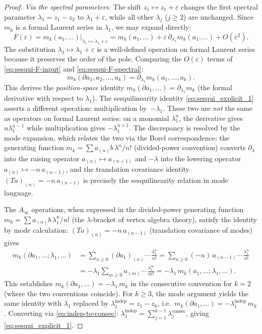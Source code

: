 \begin{proof}
\emph{Via the spectral parameters:}
The shift $z_1 \mapsto z_1 + \varepsilon$ changes the first
spectral parameter $\lambda_1 = z_1 - z_2$ to $\lambda_1 +
\varepsilon$, while all other $\lambda_j$ ($j \geq 2$) are
unchanged. Since $m_k$ is a formal Laurent series in
$\lambda_1$, we may expand directly:
\begin{equation}\label{eq:sesqui-F-spectral}
 F(\varepsilon)
 = m_k(a_1,\ldots)|_{\lambda_1 \mapsto \lambda_1 + \varepsilon}
 = m_k(a_1,\ldots)
 + \varepsilon\,\partial_{\lambda_1} m_k(a_1,\ldots)
 + O(\varepsilon^2).
\end{equation}
The substitution $\lambda_1 \mapsto \lambda_1 + \varepsilon$ is
a well-defined operation on formal Laurent series because it
preserves the order of the pole.
Comparing the $O(\varepsilon)$ terms of \eqref{eq:sesqui-F-input}
and \eqref{eq:sesqui-F-spectral}:
\[
 m_k(\partial a_1, a_2, \ldots, a_k)
 = \partial_{\lambda_1} m_k(a_1, \ldots, a_k).
\]
This derives the \emph{position-space} identity
$m_k(\partial a_1,\ldots) = \partial_{\lambda_1} m_k$
(the formal derivative with respect to $\lambda_1$).
The sesquilinearity identity \eqref{eq:sesqui_explicit_1} asserts
a different operation: multiplication by~$-\lambda_1$. These two
are \emph{not} the same as operators on formal Laurent series: on
a monomial $\lambda_1^n$, the derivative gives $n\lambda_1^{n-1}$
while multiplication gives $-\lambda_1^{n+1}$. The discrepancy is
resolved by the mode expansion, which relates the two via the
Borel correspondence: the generating function
$m_k = \sum a_{(n)}b\, \lambda^n/n!$ (divided-power convention)
converts $\partial_\lambda$ into the raising operator
$a_{(n)} \mapsto a_{(n+1)}$ and $-\lambda$ into the lowering
operator $a_{(n)} \mapsto -n\, a_{(n-1)}$, and the translation
covariance identity $(Ta)_{(n)} = -n\,a_{(n-1)}$ is precisely
the sesquilinearity relation in mode language.

The $A_\infty$ operations, when expressed in the divided-power generating function
$m_k = \sum a_{(n)}b\,\lambda_1^n/n!$ (the $\lambda$-bracket of vertex algebra
theory), satisfy the identity by mode calculation:
$(Ta)_{(n)} = -n\,a_{(n-1)}$ (translation covariance of modes) gives
\begin{align*}
 m_k(\partial a_1,\ldots;\lambda_1,\ldots)
 &= \textstyle\sum_{n\ge 0} (\partial a_1)_{(n)}\cdots\, \frac{\lambda_1^n}{n!}
 = \textstyle\sum_{n\ge 0} (-n)\, a_{(n-1)}\cdots\, \frac{\lambda_1^n}{n!}\\
 &= -\lambda_1 \textstyle\sum_{m\ge 0} a_{(m)}\cdots\, \frac{\lambda_1^m}{m!}
 = -\lambda_1\, m_k(a_1,\ldots;\lambda_1,\ldots).
\end{align*}
This establishes $m_k(\partial a_1,\ldots) = -\lambda_1\, m_k$ in the
consecutive convention for $k=2$ (where the two conventions coincide).
For $k\ge 3$, the mode argument yields the same identity with
$\lambda_1$ replaced by $\lambda_1^{\mathrm{indep}} = z_1 - z_k$, i.e.\
$m_k(\partial a_1,\ldots) = -\lambda_1^{\mathrm{indep}}\, m_k$.
Converting via \eqref{eq:indep-to-consec}:
$\lambda_1^{\mathrm{indep}} = \sum_{j=1}^{k-1}\lambda_j^{\mathrm{consec}}$,
giving \eqref{eq:sesqui_explicit_1}.


\end{proof}

